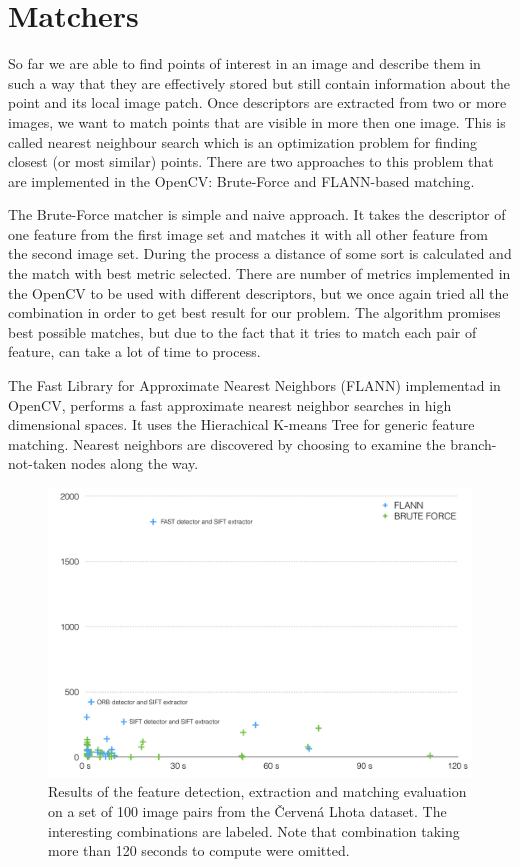 \section{Matchers}
\label{sec:matchers}
So far we are able to find points of interest in an image and describe them in such a way that they are effectively stored but still contain information about the point and its local image patch. Once descriptors are extracted from two or more images, we want to match points that are visible in more then one image. This is called nearest neighbour search which is an optimization problem for finding closest (or most similar) points. There are two approaches to this problem that are implemented in the OpenCV: Brute-Force and FLANN-based matching.

The Brute-Force matcher is simple and naive approach. It takes the descriptor of one feature from the first image set and matches it with all other feature from the second image set. During the process a distance of some sort is calculated and the match with best metric selected. There are number of metrics implemented in the OpenCV to be used with different descriptors, but we once again tried all the combination in order to get best result for our problem. The algorithm promises best possible matches, but due to the fact that it tries to match each pair of feature, can take a lot of time to process. 

The Fast Library for Approximate Nearest Neighbors (FLANN) implementad in OpenCV, performs a fast approximate nearest neighbor searches in high dimensional spaces. It uses the Hierachical K-means Tree for generic feature matching. Nearest neighbors are discovered by choosing to examine the branch-not-taken nodes along the way.

\begin{figure}[ht]
	\begin{center}
		\includegraphics[keepaspectratio,width=12cm]{fig/matchers.pdf}
	\end{center}
	\caption{Results of the feature detection, extraction and matching evaluation on a set of 100 image pairs from the Červená Lhota dataset. The interesting combinations are labeled. Note that combination taking more than 120 seconds to compute were omitted.}
	\label{fig:matchers}
\end{figure}

